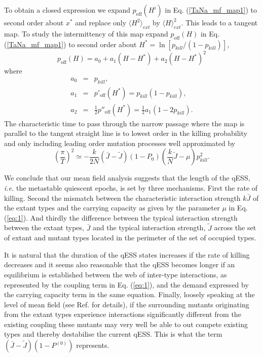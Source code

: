 \documentclass[12pt]{article}
\begin{document}
To obtain a closed expression we expand $p_\text{off}(H^i)$ in Eq. (\ref{TaNa_mf_map1}) to second order about $x^*$ and replace only $\langle H^2\rangle_{ext}$ by $\langle H\rangle^2_{ext}$. This leads to a tangent map. To study the intermittency of this map expand $p_\text{off}(H)$ in Eq. (\ref{TaNa_mf_map1}) to second order about $H^*=\ln [p_{kill}/(1-p_{kill}) ]$,
\begin{equation}
	p_\text{off}(H) = a_0+a_1(H-H^*)+a_2(H-H^*)^2
	\label{2nd_ord}
\end{equation}
where 
\begin{eqnarray*}
	a_0&=&p_{kill},\\
	a_1&=&p'_\text{off}(H^*)=p_{kill}(1-p_{kill}),\\
	a_2&=&\frac{1}{2}p''_\text{off}(H^*)= \frac{1}{2}a_1(1-2p_{kill}).
\end{eqnarray*}
The characteristic time to pass through the narrow passage where the map is parallel to the tangent straight line is to lowest order in the killing probability and only including leading order mutation processes well approximated by
\begin{equation}
	\left(\frac{\pi}{T}\right)^2\simeq -\frac{k}{2N}(\bar{J}-\tilde{J})(1-P_0)\left(\frac{k}{N}\tilde{J}-\mu\right)p_{kill}^2.
	\label{T_duration}
\end{equation}

We conclude that our mean field analysis suggests that the length of the qESS, \textit{i.e.} the metastable quiescent epochs, is set by three mechanisms. First the rate of killing. Second the mismatch between the characteristic interaction strength $k\bar{J}$ of the extant types and the carrying capacity as given by the parameter $\mu$ in Eq. (\ref{eq:1}). And thirdly the difference between the typical interaction strength between the extant types, $\bar{J}$ and the typical interaction strength, $\tilde{J}$ across the set of extant and mutant types located in the perimeter of the set of  occupied types. 

It is natural that the duration of the qESS states increases if the rate of killing decreases and it seems also reasonable that the qESS becomes longer if an equilibrium is established between the web of inter-type interactions, as represented by the coupling term in Eq. (\ref{eq:1}), and the demand expressed by the carrying capacity term in the same equation. Finally, loosely speaking at the level of mean field (see Ref. \cite{ADR_HJJ_DP_AR1} for details), if the surrounding mutants originating from the extant types experience interactions significantly different from the existing coupling these mutants may very well be able to out compete existing types and thereby destabilise the current qESS. This is what the term $(\bar{J}-\tilde{J})(1-P^{(0)})$ represents.     
\end{document}
